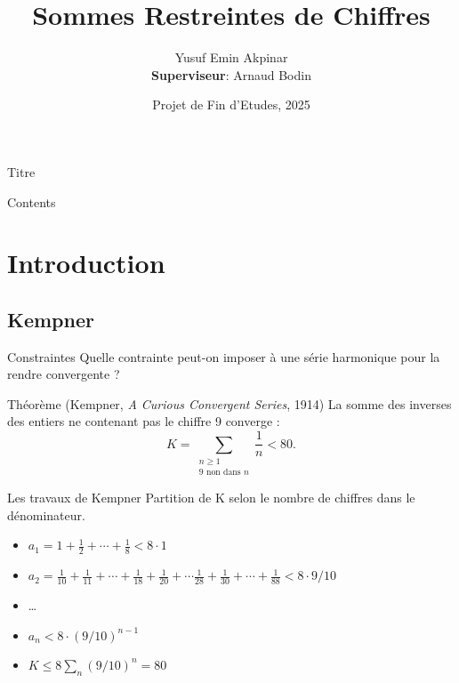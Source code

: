 \documentclass{beamer}
\title 
{%
  Sommes Restreintes de Chiffres%
}
\author[Yusuf Emin Akpinar]
{
	{Yusuf Emin Akpinar\\[1ex]
	{\small \textbf{Superviseur}: Arnaud Bodin}}
}
\date
{Projet de Fin d'Etudes, 2025}
\begin{document}
\begin{frame}{Titre}
  \titlepage
\end{frame}

\begin{frame}{Contents}
  \tableofcontents
\end{frame}


\section{Introduction}

\subsection{Kempner}

\begin{frame}{Constraintes}
	Quelle contrainte peut-on imposer à une série harmonique pour la rendre
	convergente ?
	\begin{block}{Th\'eor\`eme (Kempner, \textit{A Curious Convergent Series},
		1914)}
	La somme des inverses des entiers ne contenant pas le chiffre 9 converge :
	\[ K = \sum_{\substack{n\geq1 \\ \text{9 non dans } n}} \frac{1}{n} < 80. \]
	\end{block}
\end{frame}

\begin{frame}{Les travaux de Kempner}
	Partition de K selon le nombre de chiffres dans le dénominateur.

	\vspace{0.5em}

	\begin{itemize}
	  \item \( a_1 = 1 + \frac{1}{2} + \cdots + \frac{1}{8} < 8 \cdot 1 \)
	  \item \( a_2 = \frac{1}{10} + \frac{1}{11} + \cdots + \frac{1}{18} +
		  \frac{1}{20} + \cdots \frac{1}{28} + \frac{1}{30} + \cdots+
		  \frac{1}{88} < 8 \cdot 9/10 \)
	  \item \dots
	  \item $ a_{n} < 8 \cdot \left(9/10\right)^{n-1}$
	  \item $K \le 8 \sum_{n} (9/10)^{n} = 80$
	\end{itemize}

	\vspace{0.5em}

\end{frame}
\end{document}

